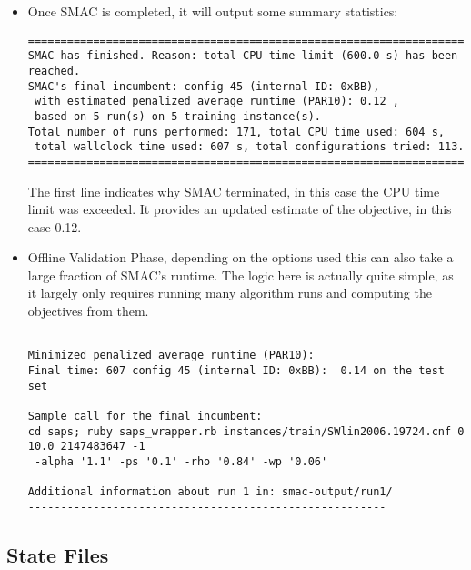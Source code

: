 \documentclass[manual.tex]{subfiles}
\begin{document}
\begin{itemize}
\item 
Once SMAC is completed, it will output some summary statistics:

\scriptsize{
\begin{verbatim}
=======================================================================================
SMAC has finished. Reason: total CPU time limit (600.0 s) has been reached.   
SMAC's final incumbent: config 45 (internal ID: 0xBB), 
 with estimated penalized average runtime (PAR10): 0.12 ,
 based on 5 run(s) on 5 training instance(s).
Total number of runs performed: 171, total CPU time used: 604 s,
 total wallclock time used: 607 s, total configurations tried: 113.
=======================================================================================
\end{verbatim}
}
\normalsize
The first line indicates why SMAC terminated, in this case the CPU time limit
was exceeded. It provides an updated estimate of the objective, in this case 0.12. 


\item Offline Validation Phase, depending on the options used this can also take a large fraction of SMAC's runtime. The logic here is actually quite simple, as it largely only requires running many algorithm runs and computing the objectives from them.


\scriptsize{
\begin{verbatim}
-------------------------------------------------------
Minimized penalized average runtime (PAR10):
Final time: 607 config 45 (internal ID: 0xBB):  0.14 on the test set

Sample call for the final incumbent:
cd saps; ruby saps_wrapper.rb instances/train/SWlin2006.19724.cnf 0 10.0 2147483647 -1
 -alpha '1.1' -ps '0.1' -rho '0.84' -wp '0.06'

Additional information about run 1 in: smac-output/run1/
-------------------------------------------------------
\end{verbatim}
}
\normalsize



\end{itemize}

\subsection{State Files}\label{subsec:state-files}
\end{document}
